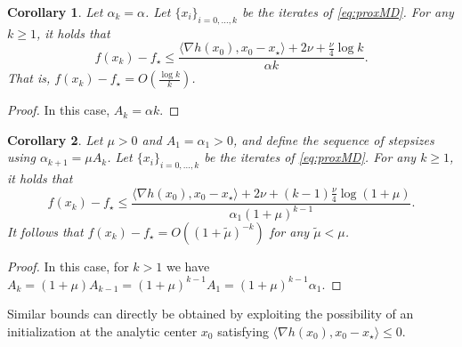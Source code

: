 \documentclass[a4paper]{article}
\renewcommand{\leq}{\leqslant}
\renewcommand{\geq}{\geqslant}
\newcommand{\ip}[2]{\langle #1, #2\rangle}
\newtheorem{corollary}{Corollary}
\begin{document}
\begin{corollary}
        Let $\alpha_k=\alpha$.
        Let $\{x_i\}_{i=0,\ldots,k}$ be the iterates of \eqref{eq:proxMD}.
        For any $k\geq 1$, it holds that 
        \begin{equation}\label{eq:proxMD_guarantee_constantstepsize}
                f(x_k)-f_\star\leq \frac{ \ip{\nabla h(x_{0})}{ x_{0}-x_\star} + 2\nu + \frac \nu 4\log {k}}{\alpha k}.
        \end{equation}
        That is, $f(x_k)-f_\star = O(\frac{\log k}{k})$.
\end{corollary}
\begin{proof}
        In this case, $A_k=\alpha k$.
\end{proof}

\begin{corollary}\label{cor:proxMD_exponentialstepsize} 
        Let $\mu>0$ and $A_1=\alpha_1>0$, and define the sequence of stepsizes using $\alpha_{k+1}=\mu A_k$.
        Let $\{x_i\}_{i=0,\ldots,k}$ be the iterates of \eqref{eq:proxMD}.
        For any $k\geq 1$, it holds that
        \begin{equation}\label{eq:proxMD_guarantee_exponentialstepsize}
                f(x_k)-f_\star\leq \frac{ \ip{\nabla h(x_{0})}{ x_{0}-x_\star} + 2\nu + (k-1)\frac \nu 4\log(1+\mu)}{\alpha_1(1+\mu)^{k-1}}.
        \end{equation}
        It follows that $f(x_k)-f_\star=O((1+\tilde{\mu})^{-k})$ for any $\tilde{\mu}<\mu$.
\end{corollary}
\begin{proof}
        In this case, for $k>1$ we have $A_{k}=(1+\mu)A_{k-1}=(1+\mu)^{k-1} A_1 = (1+\mu)^{k-1}\alpha_1$.
\end{proof}
Similar bounds can directly be obtained by exploiting the possibility of an initialization at the analytic center $x_0$ satisfying $\ip{\nabla h(x_0)}{x_0-x_\star}\leq 0$.
\end{document}
